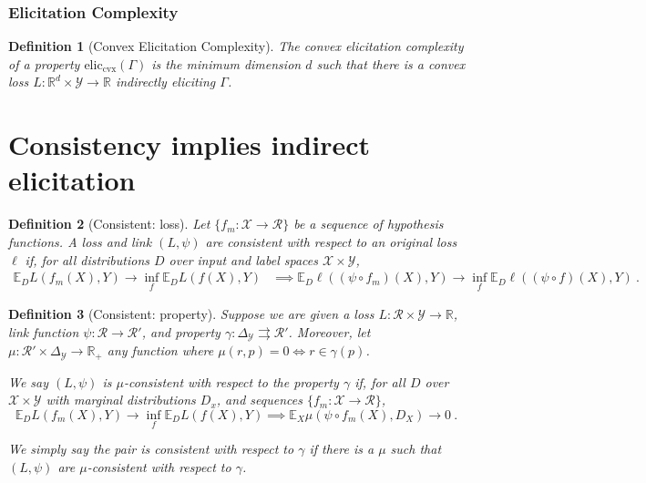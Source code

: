 \documentclass{article}
\newcommand{\Comments}{1}
\newcommand{\mynote}[2]{\ifnum\Comments=1\textcolor{#1}{#2}\fi}
\newcommand{\mytodo}[2]{\ifnum\Comments=1%
	\todo[linecolor=#1!80!black,backgroundcolor=#1,bordercolor=#1!80!black]{#2}\fi}
\newcommand{\raft}[1]{\mytodo{green!20!white}{RF: #1}}
\newcommand{\jessie}[1]{\mynote{purple}{[JF: #1]}}
\newcommand{\reals}{\mathbb{R}}
\newcommand{\simplex}{\Delta_\Y}
\newcommand{\eliccvx}{\mathrm{elic}_\mathrm{cvx}}
\newcommand{\propdis}{\mu}
\newcommand{\E}{\mathbb{E}}
\newcommand{\R}{\mathcal{R}}
\newcommand{\X}{\mathcal{X}}
\newcommand{\Y}{\mathcal{Y}}
\newcommand{\toto}{\rightrightarrows}
\newtheorem{definition}{Definition}
\begin{document}
\subsubsection{Elicitation Complexity}\label{subsec:elic-cplx}

\begin{definition}[Convex Elicitation Complexity]
	The \emph{convex elicitation complexity} of a property $\eliccvx(\Gamma)$ is the minimum dimension $d$ such that there is a convex loss $L : \reals^d \times \Y \to \reals$ indirectly eliciting $\Gamma$.
\end{definition}


\section{Consistency implies indirect elicitation}\label{sec:consis-implies-indir}
\begin{definition}[Consistent: loss]\label{def:consistent-ell}
	Let $\{f_m : \X \to \R\}$ be a sequence of hypothesis functions.
	A loss and link $(L,\psi)$ are consistent with respect to an original loss $\ell$ if, for all distributions $D$ over input and label spaces $\X \times\Y$, 
	\begin{align*}
	\E_D L(f_m(X), Y) \to \inf_f \E_D L(f(X), Y) &\implies \E_D \ell((\psi \circ f_m)(X), Y) \to \inf_f \E_D \ell((\psi \circ f)(X), Y)~.~
	\end{align*}
\end{definition}

\begin{definition}[Consistent: property]\label{def:consistent-prop}
	Suppose we are given a loss $L : \R \times \Y \to \reals$, link function $\psi: \R \to \R'$, and property $\gamma:\simplex \toto \R'$.
	Moreover, let $\propdis : \R' \times \simplex \to \reals_+$ any function where $\propdis(r,p) = 0 \iff r \in \gamma(p)$.
	
	We say $(L, \psi)$ is \emph{$\mu$-consistent with respect to the property} $\gamma$ if, for all $D$ over $\X \times \Y$ with marginal distributions $D_x$, and sequences $\{f_m: \X \to \R\}$, 
	\begin{equation}
	\E_{D} L(f_m(X), Y) \to \inf_f \E_{D} L( f(X), Y) \implies \E_X \propdis(\psi \circ f_m(X), D_X) \to 0~.~
	\end{equation}
	
	We simply say the pair is consistent with respect to $\gamma$ if there is a $\propdis$ such that $(L,\psi)$ are $\propdis$-consistent with respect to $\gamma$.
\end{definition}
\end{document}
